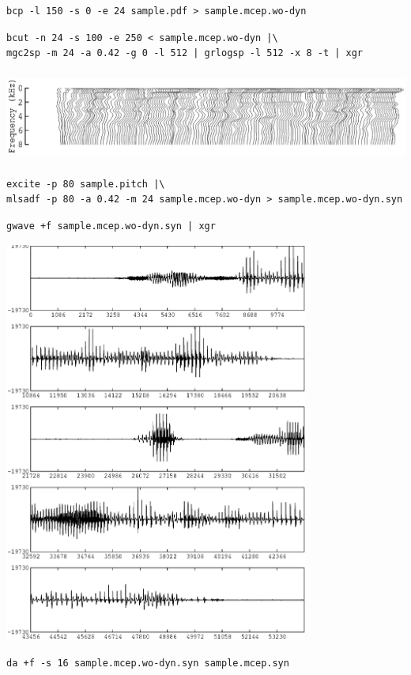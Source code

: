 \documentclass[a4paper]{article}
\begin{document}
\begin{verbatim}
bcp -l 150 -s 0 -e 24 sample.pdf > sample.mcep.wo-dyn
\end{verbatim}

\begin{verbatim}
bcut -n 24 -s 100 -e 250 < sample.mcep.wo-dyn |\
mgc2sp -m 24 -a 0.42 -g 0 -l 512 | grlogsp -l 512 -x 8 -t | xgr
\end{verbatim}

\includegraphics[height=3cm]{sample.mcep.wo-dyn.grlogsp-t.eps}

\begin{verbatim}
excite -p 80 sample.pitch |\
mlsadf -p 80 -a 0.42 -m 24 sample.mcep.wo-dyn > sample.mcep.wo-dyn.syn
\end{verbatim}

\begin{verbatim}
gwave +f sample.mcep.wo-dyn.syn | xgr
\end{verbatim}

\includegraphics[width=10cm]{sample.mcep.wo-dyn.syn.gwave.eps}

\begin{verbatim}
da +f -s 16 sample.mcep.wo-dyn.syn sample.mcep.syn
\end{verbatim}
\end{document}
